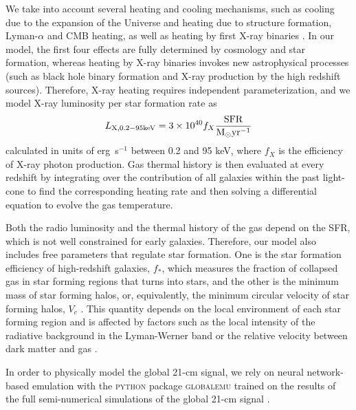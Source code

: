 We take into account several heating and cooling mechanisms, such as cooling due to the expansion of the Universe and heating due to structure formation, Lyman-$\alpha$ \cite{Madau1997, Chuzhoy2007} and CMB \cite{Venumadhav2018} heating, as well as heating by first X-ray binaries \cite{fialkov_observable_2014}. In our model, the first four effects are fully determined by cosmology and star formation, whereas heating by X-ray binaries invokes new astrophysical processes (such as black hole binary formation and X-ray production by the high redshift sources). Therefore, X-ray heating requires independent parameterization, and we model X-ray luminosity per star formation rate \cite{Fragos_Xrays_2013} as 
\begin{equation}
    L_\mathrm{X, 0.2 - 95 \textnormal{keV}} = 3\times10^{40} f_X \frac{\mathrm{SFR}}{\mathrm{M}_\odot\mathrm{yr}^{-1}}
\end{equation}
calculated in units of erg~s$^{-1}$ between 0.2 and 95 keV, where $f_X$ is the efficiency of X-ray photon production.
Gas thermal history is then evaluated at every redshift by integrating over the contribution of all galaxies within the past light-cone to find the corresponding heating rate and then solving a differential equation to evolve the gas temperature. 

Both the radio luminosity and the thermal history of the gas depend on the SFR, which is not well constrained for early galaxies. Therefore, our model also includes free parameters that regulate star formation. One is the star formation efficiency of high-redshift galaxies, $f_*$, which measures the fraction of collapsed gas in star forming regions that turns into stars, and the other is the minimum  mass of star forming halos, or, equivalently, the minimum circular velocity of star forming halos, $V_c$ \cite{Barkana_mass_2001}.
This quantity depends on the local environment of each star forming region and is affected by factors such as the local intensity of the radiative background in the Lyman-Werner band \cite{Fialkov_lyw_2013, Schauer2021} or the relative velocity between dark matter and gas \cite{Tseliakhovich2010, Fialkov2012, Schauer2021}.

In order to physically model the global 21-cm signal, we rely on neural network-based emulation with the \textsc{python} package \textsc{globalemu} \citep[e.g. \cref{ch:globalemu},][]{Bevins_globalemu_2021} trained on the results of the full semi-numerical simulations of the global 21-cm signal \citep[][]{Visbal_2012, Fialkov_rich_2014, Fialkov2019, Cohen_global_2017, Reis2020, Reis_sta_2021}.

